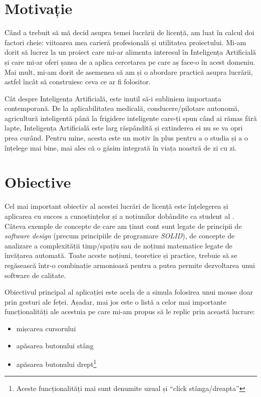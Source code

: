 \section*{Motivație}

Când a trebuit să mă decid asupra temei lucrării de licență, am luat în calcul doi factori cheie: viitoarea mea carieră profesională și utilitatea proiectului.
Mi-am dorit să lucrez la un proiect care mi-ar alimenta interesul în Inteligența Artificială și care mi-ar oferi șansa de a aplica cercetarea pe care aș face-o în acest domeniu.
Mai mult, mi-am dorit de asemenea să am și o abordare practică asupra lucrării, astfel încât să construiesc ceva ce ar fi folositor.

Cât despre Inteligența Artificială, este inutil să-i subliniem importanța contemporană.
De la aplicabilitatea medicală, conducere/pilotare autonomă, agricultură inteligentă până la frigidere inteligente care-ți spun când ai rămas fără lapte, Inteligența Artificială este larg răspândită și extinderea ei nu se va opri prea curând.
Pentru mine, acesta este un motiv în plus pentru a o studia și a o înțelege mai bine, mai ales că o găsim integrată în viața noastră de zi cu zi.

\section*{Obiective}

Cel mai important obiectiv al acestei lucrări de licență este înțelegerea și aplicarea cu succes a cunoștințelor și a noțiunilor dobândite ca student al \facultyg.
Câteva exemple de concepte de care am ținut cont sunt legate de principii de \emph{software design} (precum principiile de programare \emph{SOLID}), de concepte de analizare a complexității timp/spațiu sau de noțiuni matematice legate de învățarea automată.
Toate aceste noțiuni, teoretice și practice, trebuie să se regăsească într-o combinație armonioasă pentru a putea permite dezvoltarea unui software de calitate.

Obiectivul principal al aplicației este acela de a simula folosirea unui mouse doar prin gesturi ale feței.
Așadar, mai jos este o listă a celor mai importante funcționalități ale acestuia pe care mi-am propus să le replic prin această lucrare:
\begin{itemize}
    \item mișcarea cursorului
    \item apăsarea butonului stâng
    \item apăsarea butonului drept\footnote{Aceste funcționalități mai sunt denumite uzual și ``click stânga/dreapta''}
\end{itemize}

